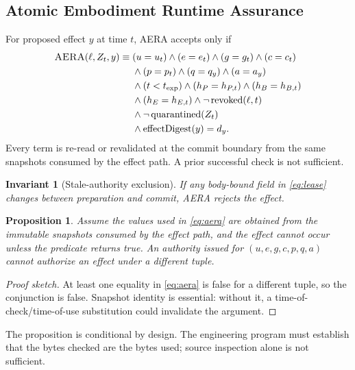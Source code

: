 \documentclass[journal,10pt]{IEEEtran}
\newcommand{\AERA}{\textsc{AERA}}
\newtheorem{proposition}{Proposition}
\newtheorem{invariant}{Invariant}
\begin{document}
\subsection{Atomic Embodiment Runtime Assurance}
For proposed effect $y$ at time $t$, \AERA{} accepts only if
\begin{align}
\AERA(\ell,Z_t,y)\equiv{}&
 (u=u_t)\land(e=e_t)\land(g=g_t)\land(c=c_t)\nonumber\\
&\land(p=p_t)\land(q=q_y)\land(a=a_y)\nonumber\\
&\land(t<t_{\mathrm{exp}})\land(h_P=h_{P,t})\land(h_B=h_{B,t})\nonumber\\
&\land(h_E=h_{E,t})\land\neg\operatorname{revoked}(\ell,t)\nonumber\\
&\land\neg\operatorname{quarantined}(Z_t)\nonumber\\
&\land\operatorname{effectDigest}(y)=d_y. \label{eq:aera}
\end{align}
Every term is re-read or revalidated at the commit boundary from the same snapshots consumed by the effect path. A prior successful check is not sufficient.

\begin{invariant}[Stale-authority exclusion]
If any body-bound field in \eqref{eq:lease} changes between preparation and commit, \AERA{} rejects the effect.
\end{invariant}

\begin{proposition}
Assume the values used in \eqref{eq:aera} are obtained from the immutable snapshots consumed by the effect path, and the effect cannot occur unless the predicate returns true. An authority issued for $(u,e,g,c,p,q,a)$ cannot authorize an effect under a different tuple.
\end{proposition}

\begin{proof}[Proof sketch]
At least one equality in \eqref{eq:aera} is false for a different tuple, so the conjunction is false. Snapshot identity is essential: without it, a time-of-check/time-of-use substitution could invalidate the argument.
\end{proof}

The proposition is conditional by design. The engineering program must establish that the bytes checked are the bytes used; source inspection alone is not sufficient.
\end{document}
